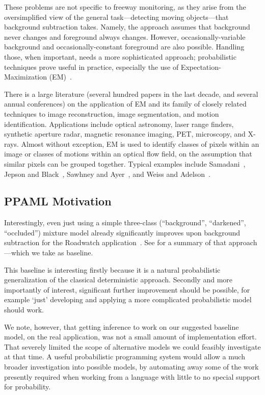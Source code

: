 These problems are not specific to freeway monitoring, as they arise
from the oversimplified view of the 
general task---detecting moving objects---that
background subtraction takes.  Namely, the approach assumes that
background never changes and foreground always changes.  However,
occasionally-variable background and occasionally-constant
foreground are also possible.  Handling those, when important, needs a
more sophisticated approach; probabilistic techniques prove useful in practice,
especially the use of Expectation-Maximization (EM)~\cite{Dempster+al:1977}.

There is a large literature (several hundred papers in the last
decade, and several annual conferences) on the application
of EM and its family of closely related techniques
to image reconstruction, image segmentation, and
motion identification.   Applications include optical astronomy, laser
range finders, synthetic aperture radar, magnetic resonance imaging, PET, microscopy, and
X-rays.  Almost without exception, EM is used to identify classes of
pixels within an image or classes of motions within an optical flow
field, on the assumption that similar pixels can be grouped
together. Typical examples include Samadani~\cite{Samadani:1995},
Jepson and Black~\cite{Jepson+Black:1993}, Sawhney and
Ayer~\cite{Sawhney+Ayer:1996}, and Weiss and
Adelson~\cite{Weiss+Adelson:1996}.

\subsection{PPAML Motivation}

Interestingly, even just using a simple three-class (``background'', ``darkened'',
``occluded'') mixture model already significantly improves upon
background subtraction for the Roadwatch application~\cite{friedman1997image}.  See
 for a summary of
that approach---which we take as baseline.

This baseline is interesting firstly because it is a natural
probabilistic generalization of the 
classical deterministic approach.
Secondly and more importantly of interest, significant further
improvement should be possible, for example `just' developing and
applying a more complicated probabilistic model should work.

We note, however, that getting inference to work on our suggested baseline
model, on the real application, was not a small amount of
implementation effort.  That severely limited the scope of alternative models we could
feasibly investigate at that time.  A useful probabilistic programming
system would allow a much broader investigation into possible models,
by automating away some of the work presently required when working
from a language with little to no special support for probability.


